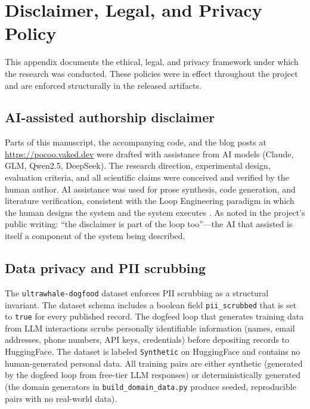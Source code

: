 \appendix
\section{Disclaimer, Legal, and Privacy Policy}
\label{sec:disclaimer}

This appendix documents the ethical, legal, and privacy framework under
which the research was conducted. These policies were in effect throughout
the project and are enforced structurally in the released artifacts.

\subsection{AI-assisted authorship disclaimer}
\label{sec:disclaimer:ai}

Parts of this manuscript, the accompanying code, and the blog posts at
\url{https://pocoo.vaked.dev} were drafted with assistance from AI models
(Claude, GLM, Qwen2.5, DeepSeek). The research direction, experimental
design, evaluation criteria, and all scientific claims were conceived and
verified by the human author. AI assistance was used for prose synthesis,
code generation, and literature verification, consistent with the Loop
Engineering paradigm in which the human designs the system and the system
executes \citep{osmani2026loop}. As noted in the project's public writing:
``the disclaimer is part of the loop too''---the AI that assisted is itself
a component of the system being described.

\subsection{Data privacy and PII scrubbing}
\label{sec:disclaimer:privacy}

The \texttt{ultrawhale-dogfood} dataset enforces PII scrubbing as a
structural invariant. The dataset schema includes a boolean field
\texttt{pii\_scrubbed} that is set to \texttt{true} for every published
record. The dogfeed loop that generates training data from LLM interactions
scrubs personally identifiable information (names, email addresses, phone
numbers, API keys, credentials) before depositing records to HuggingFace.
The dataset is labeled \texttt{Synthetic} on HuggingFace and contains no
human-generated personal data. All training pairs are either synthetic
(generated by the dogfeed loop from free-tier LLM responses) or
deterministically generated (the domain generators in
\texttt{build\_domain\_data.py} produce seeded, reproducible pairs with no
real-world data).

